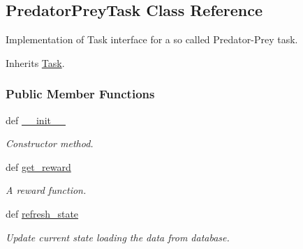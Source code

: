 \hypertarget{class_predator_prey_task_1_1_predator_prey_task}{\subsection{Predator\+Prey\+Task Class Reference}
\label{class_predator_prey_task_1_1_predator_prey_task}
}


Implementation of Task interface for a so called Predator-\/\+Prey task.  




Inherits \hyperlink{class_task_1_1_task}{Task}.

\subsubsection*{Public Member Functions}
\begin{DoxyCompactItemize}
\item 
\hypertarget{class_predator_prey_task_1_1_predator_prey_task_ac775ee34451fdfa742b318538164070e}{def \hyperlink{class_predator_prey_task_1_1_predator_prey_task_ac775ee34451fdfa742b318538164070e}{\+\_\+\+\_\+init\+\_\+\+\_\+}}\label{class_predator_prey_task_1_1_predator_prey_task_ac775ee34451fdfa742b318538164070e}

\begin{DoxyCompactList}\small\item\em Constructor method. \end{DoxyCompactList}\item 
def \hyperlink{class_predator_prey_task_1_1_predator_prey_task_aa97b81cdb2e9a08c63eab0ca7e94bf66}{get\+\_\+reward}
\begin{DoxyCompactList}\small\item\em A reward function. \end{DoxyCompactList}\item 
def \hyperlink{class_predator_prey_task_1_1_predator_prey_task_a09e7b7d13235130045548d33b3352a1d}{refresh\+\_\+state}
\begin{DoxyCompactList}\small\item\em Update current state loading the data from database. \end{DoxyCompactList}\end{DoxyCompactItemize}
